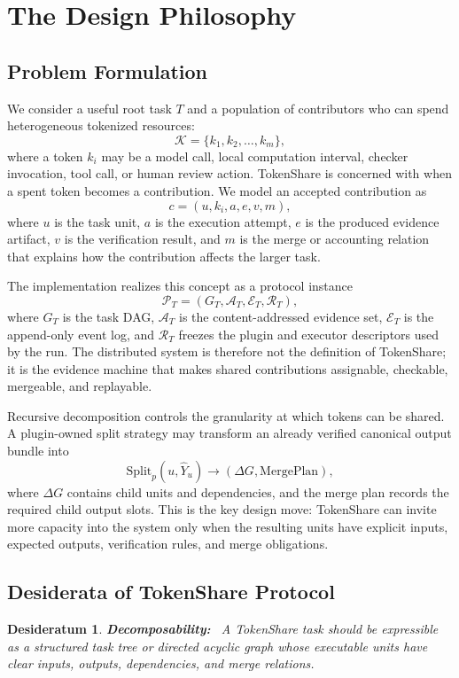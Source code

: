 \documentclass{article}
\theoremstyle{plain}
\newtheorem{desideratum}{Desideratum}
\begin{document}
\section{The Design Philosophy}
\subsection{Problem Formulation}

{\color{blue}
We consider a useful root task $T$ and a population of contributors who can spend heterogeneous tokenized resources:
\[
\mathcal{K}=\{k_1,k_2,\ldots,k_m\},
\]
where a token $k_i$ may be a model call, local computation interval, checker invocation, tool call, or human review action. TokenShare is concerned with when a spent token becomes a contribution. We model an accepted contribution as
\[
c=(u, k_i, a, e, v, m),
\]
where $u$ is the task unit, $a$ is the execution attempt, $e$ is the produced evidence artifact, $v$ is the verification result, and $m$ is the merge or accounting relation that explains how the contribution affects the larger task.

The implementation realizes this concept as a protocol instance
\[
\mathcal{P}_T=(G_T,\mathcal{A}_T,\mathcal{E}_T,\mathcal{R}_T),
\]
where $G_T$ is the task DAG, $\mathcal{A}_T$ is the content-addressed evidence set, $\mathcal{E}_T$ is the append-only event log, and $\mathcal{R}_T$ freezes the plugin and executor descriptors used by the run. The distributed system is therefore not the definition of TokenShare; it is the evidence machine that makes shared contributions assignable, checkable, mergeable, and replayable.

Recursive decomposition controls the granularity at which tokens can be shared. A plugin-owned split strategy may transform an already verified canonical output bundle into
\[
\mathrm{Split}_p(u,\hat{Y}_u)\rightarrow(\Delta G, \mathrm{MergePlan}),
\]
where $\Delta G$ contains child units and dependencies, and the merge plan records the required child output slots. This is the key design move: TokenShare can invite more capacity into the system only when the resulting units have explicit inputs, expected outputs, verification rules, and merge obligations.
}



\subsection{Desiderata of TokenShare Protocol}


\begin{desideratum}
\textbf{Decomposability:}~ A TokenShare task should be expressible as a structured task tree or directed acyclic graph whose executable units have clear inputs, outputs, dependencies, and merge relations.
\end{desideratum}
\end{document}
